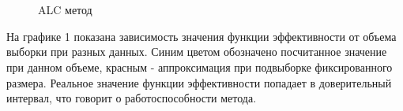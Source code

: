 \documentclass[12pt,twoside]{article}
\begin{document}
\begin{figure}[h!t]\center
{}
\\
\\

\caption{ALC метод}
\label{fig1}
\end{figure}

На графике 1 показана зависимость значения функции эффективности от объема выборки при разных данных. Синим цветом обозначено посчитанное значение при данном объеме, красным - аппроксимация при подвыборке фиксированного размера. Реальное значение функции эффективности попадает в доверительный интервал, что говорит о работоспособности метода.
\end{document}
